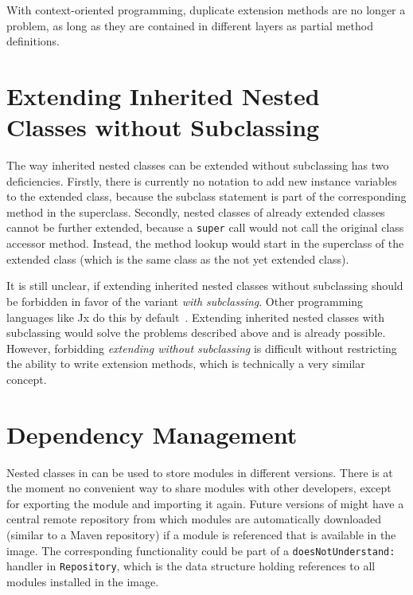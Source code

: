 With context-oriented programming, duplicate extension methods are no longer a problem, as long as they are contained in different layers as partial method definitions.


\section{Extending Inherited Nested Classes without Subclassing}
The way inherited nested classes can be extended without subclassing has two deficiencies. Firstly, there is currently no notation to add new instance variables to the extended class, because the subclass statement is part of the corresponding method in the superclass. Secondly, nested classes of already extended classes cannot be further extended, because a \texttt{super} call would not call the original class accessor method. Instead, the method lookup would start in the superclass of the extended class (which is the same class as the not yet extended class).

It is still unclear, if extending inherited nested classes without subclassing should be forbidden in favor of the variant \emph{with subclassing}. Other programming languages like Jx do this by default~\cite{Nystrom:2004:SEV:1028976.1028986}. Extending inherited nested classes with subclassing would solve the problems described above and is already possible. However, forbidding \emph{extending without subclassing} is difficult without restricting the ability to write extension methods, which is technically a very similar concept.

\section{Dependency Management}
Nested classes in \msname can be used to store modules in different versions. There is at the moment no convenient way to share modules with other developers, except for exporting the module and importing it again. Future versions of \msname might have a central remote repository from which modules are automatically downloaded (similar to a Maven repository) if a module is referenced that is available in the image. The corresponding functionality could be part of a \texttt{doesNotUnderstand:} handler in \texttt{Repository}, which is the data structure holding references to all modules installed in the image.

